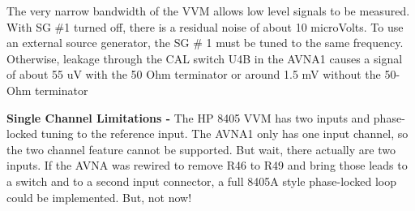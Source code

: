 The very narrow bandwidth of the VVM allows low level signals to be measured.  With SG \#1 turned off, there is a residual noise of about 10 microVolts.  To use an external source generator, the SG \# 1 must be tuned to the same frequency.  Otherwise, leakage through the CAL switch U4B in the AVNA1 causes a signal of about 55 uV with the 50 Ohm terminator or around 1.5 mV without the 50-Ohm terminator

\textbf{Single Channel Limitations - }The HP 8405 VVM has two inputs and phase-locked tuning to the reference input.  The AVNA1 only has one input channel, so the two channel feature cannot be supported.  But wait, there actually are two inputs.  If the AVNA was rewired to remove R46 to R49 and bring those leads to a switch and to a second input connector, a full 8405A style phase-locked loop could be implemented.  But, not now!

